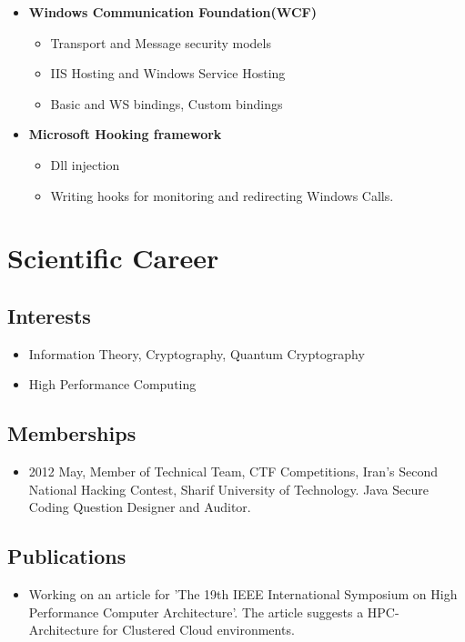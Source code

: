 \documentclass[12pt,a4paper]{article}
\begin{document}
\begin{itemize}
			\item \textbf{Windows Communication Foundation(WCF)}
				\begin{itemize}
					\item Transport and Message security models
					\item IIS Hosting and Windows Service Hosting
					\item Basic and WS bindings, Custom bindings
				\end{itemize}
			\item \textbf{Microsoft Hooking framework}
				\begin{itemize}
					\item Dll injection
					\item Writing hooks for monitoring and redirecting Windows Calls.
				\end{itemize}
		\end{itemize}		

		 
\section{Scientific Career}
	\subsection{Interests}
		\begin{itemize}
			\item Information Theory, Cryptography, Quantum Cryptography
			\item High Performance Computing
		\end{itemize}
	\subsection{Memberships}
		\begin{itemize}
			\item 2012 May, Member of Technical Team, CTF Competitions, Iran's Second National Hacking Contest, Sharif University of Technology. Java Secure Coding Question Designer and Auditor.
		\end{itemize}
	\subsection{Publications}
		\begin{itemize}
			\item Working on an article for 'The 19th IEEE International Symposium on High Performance Computer Architecture'. The article suggests a HPC-Architecture for Clustered Cloud environments.
		\end{itemize}
\end{document}
